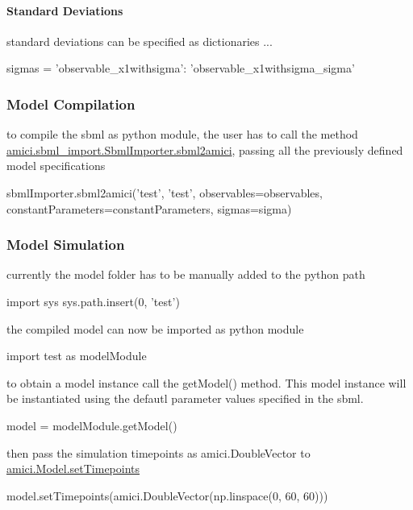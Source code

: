 \paragraph*{Standard Deviations}

standard deviations can be specified as dictionaries ... \begin{DoxyVerb}sigmas = {'observable_x1withsigma': 'observable_x1withsigma_sigma'}
\end{DoxyVerb}


\subsubsection*{Model Compilation}

to compile the sbml as python module, the user has to call the method {\ttfamily \mbox{\hyperlink{classamici_1_1sbml__import_1_1_sbml_importer_a83900bb62c0121eb798939a6d4232a9c}{amici.\+sbml\+\_\+import.\+Sbml\+Importer.\+sbml2amici}}}, passing all the previously defined model specifications \begin{DoxyVerb}sbmlImporter.sbml2amici('test', 'test', 
                        observables=observables,
                        constantParameters=constantParameters,
                        sigmas=sigma)
\end{DoxyVerb}


\subsubsection*{Model Simulation}

currently the model folder has to be manually added to the python path \begin{DoxyVerb}import sys
sys.path.insert(0, 'test')
\end{DoxyVerb}


the compiled model can now be imported as python module \begin{DoxyVerb}import test as modelModule
\end{DoxyVerb}


to obtain a model instance call the {\ttfamily get\+Model()} method. This model instance will be instantiated using the defautl parameter values specified in the sbml. \begin{DoxyVerb}model = modelModule.getModel()
\end{DoxyVerb}


then pass the simulation timepoints as {\ttfamily amici.\+Double\+Vector} to {\ttfamily \mbox{\hyperlink{classamici_1_1_model_a50f9642f9bcb883dbd3925c85abc4c24}{amici.\+Model.\+set\+Timepoints}}} \begin{DoxyVerb}model.setTimepoints(amici.DoubleVector(np.linspace(0, 60, 60))) 
\end{DoxyVerb}


